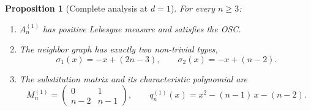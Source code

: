 \documentclass{amsart}
\newtheorem{proposition}[theorem]{Proposition}
\theoremstyle{definition}
\theoremstyle{remark}
\begin{document}
\begin{proposition}[Complete analysis at $d=1$]\label{prop:d1}
For every $n \ge 3$:
\begin{enumerate}
\item $A_n^{(1)}$ has positive Lebesgue measure and satisfies
  the OSC.
\item The neighbor graph has exactly two non-trivial types,
  \[
    \sigma_1(x) = -x + (2n{-}3), \qquad
    \sigma_2(x) = -x + (n{-}2).
  \]
\item The substitution matrix and its characteristic polynomial are
  \begin{equation}\label{eq:d1-matrix}
    M_n^{(1)} =
    \begin{pmatrix} 0 & 1 \\ n{-}2 & n{-}1 \end{pmatrix},
    \qquad
    q_n^{(1)}(x) = x^2 - (n{-}1)\,x - (n{-}2).
  \end{equation}
\end{enumerate}
\end{proposition}
\end{document}
